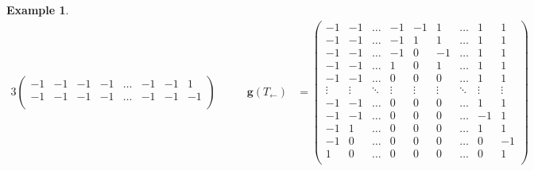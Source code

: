 \documentclass{amsart}
\theoremstyle{definition}
\newtheorem{example}[theorem]{Example}
\renewcommand{\b}[1]{{\boldsymbol{#1}}} %
\begin{document}
\begin{example}
\begin{table}[p]
\begin{alignat*}{3}
\begin{pmatrix}
		-1 & -1 & -1 & -1 & \dots & -1 & -1 & 1 \\
		-1 & -1 & -1 & -1 & \dots & -1 & -1 & -1 \\
	\end{pmatrix}
	\qquad &
	\b{g}(T_\leftarrow) & = \begin{pmatrix}
		-1 & -1 & \dots & -1 & -1 & 1 & \dots & 1 & 1 \\
		-1 & -1 & \dots & -1 & 1 & 1 & \dots & 1 & 1 \\
		-1 & -1 & \dots & -1 & 0 & -1 & \dots & 1 & 1 \\
		-1 & -1 & \dots & 1 & 0 & 1 & \dots & 1 & 1 \\
		-1 & -1 & \dots & 0 & 0 & 0 & \dots & 1 & 1 \\
		\vdots & \vdots & \ddots & \vdots & \vdots & \vdots & \ddots & \vdots & \vdots \\
		-1 & -1 & \dots & 0 & 0 & 0 & \dots & 1 & 1 \\
		-1 & -1 & \dots & 0 & 0 & 0 & \dots & -1 & 1 \\
		-1 & 1 & \dots & 0 & 0 & 0 & \dots & 1 & 1 \\
		-1 & 0 & \dots & 0 & 0 & 0 & \dots & 0 & -1 \\
		1 & 0 & \dots & 0 & 0 & 0 & \dots & 0 & 1 \\
	\end{pmatrix}

\end{alignat*}
\end{table}
\end{example}
\end{document}
